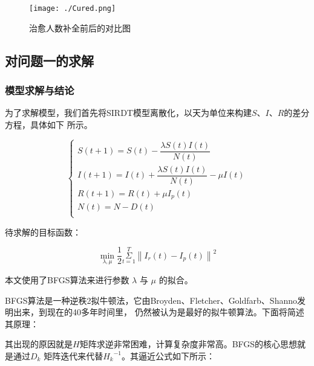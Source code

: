 \documentclass[bwprint]{gmcmthesis}
\numberwithin{figure}{section}
\begin{document}
\begin{figure}[!h]
    \centering
    \texttt{[image: ./Cured.png]}
    \caption{治愈人数补全前后的对比图}
    \label{fig1}
\end{figure}

\subsection{对问题一的求解}
\subsubsection{模型求解与结论}
\par 为了求解模型，我们首先将SIRDT模型离散化，以天为单位来构建$S$、$I$、$R$的差分方程，具体如下
所示。

\begin{equation} \label{}
    \begin{cases}
        S\left( t+1 \right) =S\left( t \right) -\dfrac{\lambda S\left( t \right) I\left( t \right)}{N\left( t \right)}\\
        I\left( t+1 \right) =I\left( t \right) +\dfrac{\lambda S\left( t \right) I\left( t \right)}{N\left( t \right)}-\mu I\left( t \right)\\
        R\left( t+1 \right) =R\left( t \right) +\mu I_p\left( t \right)\\
        N\left( t \right) =N-D\left( t \right)\\
    \end{cases}
\end{equation}


\par 待求解的目标函数：

\begin{equation} \label{}
    \underset{\lambda ,\mu}{\min}\frac{1}{2}\underset{t=1}{\overset{T}{\varSigma}}\left\| I_r\left( t \right) -I_p\left( t \right) \right\| ^2
\end{equation}

\par 本文使用了BFGS算法来进行参数 $\lambda$ 与 $\mu$ 的拟合。

\par BFGS算法是一种逆秩2拟牛顿法，它由Broyden、Fletcher、Goldfarb、Shanno发明出来，到现在的40多年时间里，
仍然被认为是最好的拟牛顿算法。下面将简述其原理：

\par 其出现的原因就是$H$矩阵求逆非常困难，计算复杂度非常高。BFGS的核心思想就是通过$D_k$
矩阵迭代来代替${H_k}^{-1}$。其逼近公式如下所示：
\end{document}
